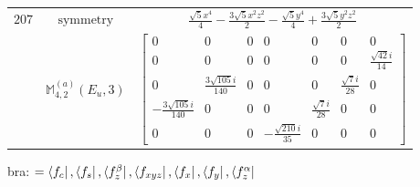 \documentclass[fleqn,8pt,landscape]{jsarticle}
\begin{document}
\begin{longtable}{ccc}
$ 207 $ & $ \text{symmetry} $ & $ \frac{\sqrt{5} x^{4}}{4} - \frac{3 \sqrt{5} x^{2} z^{2}}{2} - \frac{\sqrt{5} y^{4}}{4} + \frac{3 \sqrt{5} y^{2} z^{2}}{2} $ \\
$  $ & $ \mathbb{M}_{4,2}^{(a)}(E_{u},3) $ & $ \begin{bmatrix} 0 & 0 & 0 & 0 & 0 & 0 & 0 \\ 0 & 0 & 0 & 0 & 0 & 0 & \frac{\sqrt{42} i}{14} \\ 0 & \frac{3 \sqrt{105} i}{140} & 0 & 0 & 0 & \frac{\sqrt{7} i}{28} & 0 \\ - \frac{3 \sqrt{105} i}{140} & 0 & 0 & 0 & \frac{\sqrt{7} i}{28} & 0 & 0 \\ 0 & 0 & 0 & - \frac{\sqrt{210} i}{35} & 0 & 0 & 0 \end{bmatrix} $ \\ \hline
\end{longtable}
bra: $=\bra{f_{c}}, \bra{f_{s}}, \bra{f_{z}^{\beta}}, \bra{f_{xyz}}, \bra{f_{x}}, \bra{f_{y}}, \bra{f_{z}^{\alpha}}$
\end{document}
